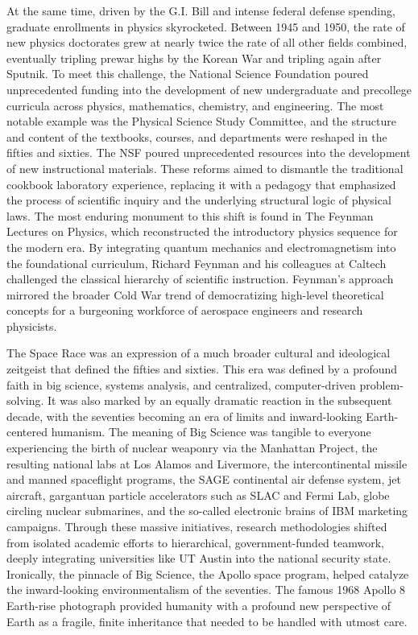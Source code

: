 At the same time, driven by the G.I. Bill and intense federal defense spending, graduate enrollments in physics skyrocketed. Between 1945 and 1950, the rate of new physics doctorates grew at nearly twice the rate of all other fields combined, eventually tripling prewar highs by the Korean War and tripling again after Sputnik. To meet this challenge, the National Science Foundation poured unprecedented funding into the development of new undergraduate and precollege curricula across physics, mathematics, chemistry, and engineering. The most notable example was the Physical Science Study Committee, and the structure and content of the textbooks, courses, and departments were reshaped in the fifties and sixties. The NSF poured unprecedented resources into the development of new instructional materials. These reforms aimed to dismantle the traditional cookbook laboratory experience, replacing it with a pedagogy that emphasized the process of scientific inquiry and the underlying structural logic of physical laws. The most enduring monument to this shift is found in The Feynman Lectures on Physics, which reconstructed the introductory physics sequence for the modern era. By integrating quantum mechanics and electromagnetism into the foundational curriculum, Richard Feynman and his colleagues at Caltech challenged the classical hierarchy of scientific instruction. Feynman’s approach mirrored the broader Cold War trend of democratizing high-level theoretical concepts for a burgeoning workforce of aerospace engineers and research physicists. 

The Space Race was an expression of a much broader cultural and ideological zeitgeist that defined the fifties and sixties. This era was defined by a profound faith in big science, systems analysis, and centralized, computer-driven problem-solving. It was also marked by an equally dramatic reaction in the subsequent decade, with the seventies becoming an era of limits and inward-looking Earth-centered humanism. The meaning of Big Science was tangible to everyone experiencing the birth of nuclear weaponry via the Manhattan Project, the resulting national labs at Los Alamos and Livermore, the intercontinental missile and manned spaceflight programs, the SAGE continental air defense system, jet aircraft, gargantuan particle accelerators such as SLAC and Fermi Lab, globe circling nuclear submarines, and the so-called electronic brains of IBM marketing campaigns. Through these massive initiatives, research methodologies shifted from isolated academic efforts to hierarchical, government-funded teamwork, deeply integrating universities like UT Austin into the national security state. Ironically, the pinnacle of Big Science, the Apollo space program, helped catalyze the inward-looking environmentalism of the seventies. The famous 1968 Apollo 8 Earth-rise photograph provided humanity with a profound new perspective of Earth as a fragile, finite inheritance that needed to be handled with utmost care.


